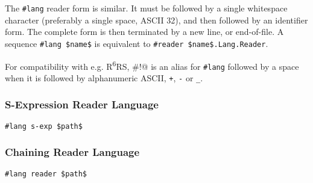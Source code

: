 The \lstinline!#lang! reader form is similar. It must be followed by a single whitespace character (preferably a single space, ASCII 32), and then followed by an identifier form. The complete form is then terminated by a new line, or end-of-file. A sequence \lstinline!#lang $name$! is equivalent to \lstinline!#reader $name$.Lang.Reader!. 


For compatibility with e.g. R\textsuperscript{6}RS, \lstinline@#!@ is an alias for \lstinline!#lang! followed by a space when it is followed by alphanumeric ASCII, \lstinline!+!, \lstinline!-! or \lstinline!_!. 





\subsubsection{S-Expression Reader Language}

\begin{lstlisting}
#lang s-exp $path$
\end{lstlisting}





\subsubsection{Chaining Reader Language}

\begin{lstlisting}
#lang reader $path$
\end{lstlisting}






